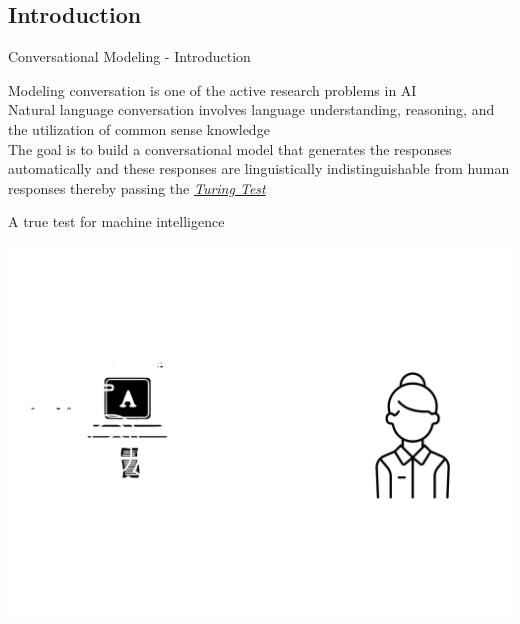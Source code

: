 \subsection{Introduction}
	\begin{frame}{Conversational Modeling - Introduction}
\begin{minipage}{0.45\linewidth}
Modeling conversation is one of the active research problems in AI\\
Natural language conversation involves language understanding, reasoning, and the utilization of common sense knowledge\\
The goal is to build a conversational model that generates the responses automatically and these responses are linguistically indistinguishable from human responses thereby passing the \textit{\underline{Turing Test}}
\end{minipage}\hfill\vline\hfill
\begin{minipage}{0.5\linewidth}
	A true test for machine intelligence
	\begin{center}
	\includegraphics[width=0.7\linewidth]{./Images/TuringTest}
\end{center}
\end{minipage}
\end{frame}

